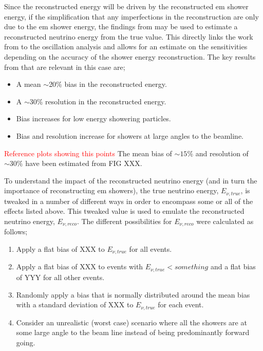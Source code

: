 Since the reconstructed \nue energy will be driven by the reconstructed \gls{em} shower energy, if the simplification that any imperfections in the reconstruction are only due to the \gls{em} shower energy, the findings from  may be used to estimate a reconstructed neutrino energy from the true value. This directly links the work from  to the oscillation analysis and allows for an estimate on the sensitivities depending on the accuracy of the shower energy reconstruction. The key results from  that are relevant in this case are; 
\begin{itemize}
    \item A mean $\sim$20\% bias in the reconstructed energy.
    \item A $\sim$30\% resolution in the reconstructed energy.
    \item Bias increases for low energy showering particles.
    \item Bias and resolution increase for showers at large angles to the beamline.
\end{itemize}

\textcolor{red}{Reference plots showing this points}
The mean bias of $\sim 15\%$ and resolution of $\sim 30\%$ have been estimated from FIG XXX. 

To understand the impact of the reconstructed neutrino energy (and in turn the importance of reconstructing \gls{em} showers), the true neutrino energy, $E_{\nu, true}$, is tweaked in a number of different ways in order to encompass some or all of the effects listed above. This tweaked value is used to emulate the reconstructed neutrino energy, $E_{\nu, reco}$. The different possibilities for $E_{\nu, reco}$ were calculated as follows;
\begin{enumerate}
    \item Apply a flat bias of XXX to $E_{\nu, true}$ for all events.
    \item Apply a flat bias of XXX to events with $E_{\nu, true} < something$ and a flat bias of YYY for all other events.
    \item Randomly apply a bias that is normally distributed around the mean bias with a standard deviation of XXX to $E_{\nu, true}$ for each event.
    \item Consider an unrealistic (worst case) scenario where all the showers are at some large angle to the beam line instead of being predominantly forward going. 
\end{enumerate}

